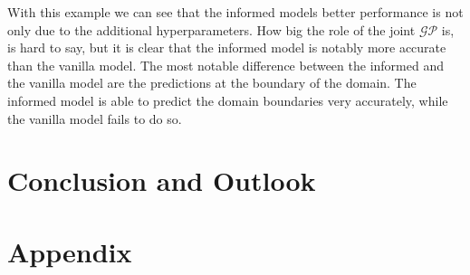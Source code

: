 \documentclass{article}
\begin{document}
With this example we can see that the informed models better performance is not only due to the additional hyperparameters. How big the role of the joint $\mathcal{GP}$ is, is hard to say, but it is clear that the informed model is notably more accurate than the vanilla model. The most notable difference between the informed and the vanilla model are the predictions at the boundary of the domain. The informed model is able to predict the domain boundaries very accurately, while the vanilla model fails to do so.\\
\newpage
\section{Conclusion and Outlook}

\section{Appendix}





\end{document}

